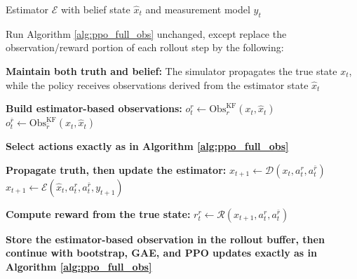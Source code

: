 \begin{algorithm}[H]
\caption{KF-On Modifications to Algorithm \ref{alg:ppo_full_obs}}
\label{alg:ppo_kf_on}
\begin{algorithmic}[1]
\Require Estimator $\mathcal{E}$ with belief state $\hat{x}_t$ and measurement model $y_t$

\State Run Algorithm \ref{alg:ppo_full_obs} unchanged, except replace the observation/reward portion of each rollout step by the following:

\State \textbf{Maintain both truth and belief:}
\State \hspace{1em} The simulator propagates the true state $x_t$, while the policy receives observations derived from the estimator state $\hat{x}_t$

\State \textbf{Build estimator-based observations:}
\State \hspace{1em} $o_t^r \leftarrow \mathrm{Obs}^{\mathrm{KF}}_r(x_t,\hat{x}_t)$
\State \hspace{1em} $o_t^{\bar r} \leftarrow \mathrm{Obs}^{\mathrm{KF}}_{\bar r}(x_t,\hat{x}_t)$

\State \textbf{Select actions exactly as in Algorithm \ref{alg:ppo_full_obs}}

\State \textbf{Propagate truth, then update the estimator:}
\State \hspace{1em} $x_{t+1} \leftarrow \mathcal{D}(x_t,a_t^r,a_t^{\bar r})$
\State \hspace{1em} $\hat{x}_{t+1} \leftarrow \mathcal{E}(\hat{x}_t,a_t^r,a_t^{\bar r},y_{t+1})$

\State \textbf{Compute reward from the true state:}
\State \hspace{1em} $r_t^r \leftarrow \mathcal{R}(x_{t+1},a_t^r,a_t^{\bar r})$

\State \textbf{Store the estimator-based observation in the rollout buffer, then continue with bootstrap, GAE, and PPO updates exactly as in Algorithm \ref{alg:ppo_full_obs}}
\end{algorithmic}
\end{algorithm}